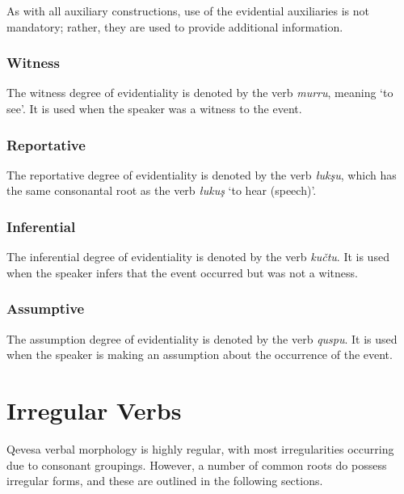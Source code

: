 \documentclass[grammar]{subfiles}
\begin{document}
	As with all auxiliary constructions, use of the evidential auxiliaries is not mandatory; rather, they are used to provide additional information. 

	\subsubsection{Witness}
	\label{sssec:vm_evd_witness}

	The witness degree of evidentiality is denoted by the verb \emph{murru}, meaning ‘to see’. It is used when the speaker was a witness to the event.

	\subsubsection{Reportative}
	\label{sssec:vm_evd_reportative}

	The reportative degree of evidentiality is denoted by the verb \emph{łukşu}, which has the same consonantal root as the verb \emph{łukuş} ‘to hear (speech)’.

	\subsubsection{Inferential}
	\label{sssec:vm_evd_inferential}

	The inferential degree of evidentiality is denoted by the verb \emph{kučtu}. It is used when the speaker infers that the event occurred but was not a witness.

	\subsubsection{Assumptive}
	\label{sssec:vm_evd_assumption}

	The assumption degree of evidentiality is denoted by the verb \emph{quspu}. It is used when the speaker is making an assumption about the occurrence of the event.

	\section{Irregular Verbs}
	\label{sec:vm_irregular}

	Qevesa verbal morphology is highly regular, with most irregularities occurring due to consonant groupings. %
	However, a number of common roots do possess irregular forms, and these are outlined in the following sections.
\end{document}
